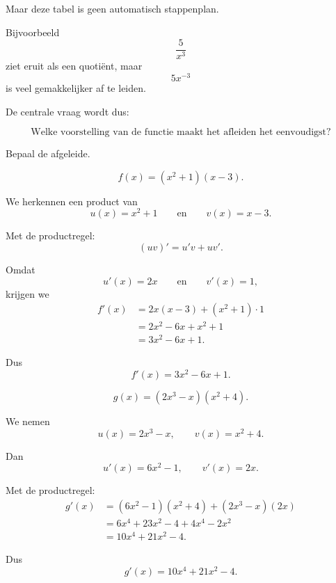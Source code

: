 \documentclass{ximera}
\begin{document}
Maar deze tabel is geen automatisch stappenplan.

Bijvoorbeeld
\[
\frac{5}{x^3}
\]
ziet eruit als een quotiënt, maar
\[
5x^{-3}
\]
is veel gemakkelijker af te leiden.

De centrale vraag wordt dus:

\[
\boxed{
\text{Welke voorstelling van de functie maakt het afleiden het eenvoudigst?}
}
\]




\begin{oefening}{\oefB\ESS}

  Bepaal de afgeleide.
  
  \begin{question}
  
  \[
  f(x)=(x^2+1)(x-3).
  \]
  
  \begin{oplossing}
  We herkennen een product van
  \[
  u(x)=x^2+1
  \qquad\text{en}\qquad
  v(x)=x-3.
  \]
  
  Met de productregel:
  \[
  (uv)'=u'v+uv'.
  \]
  
  Omdat
  \[
  u'(x)=2x
  \qquad\text{en}\qquad
  v'(x)=1,
  \]
  krijgen we
  \[
  \begin{aligned}
  f'(x)
  &=2x(x-3)+(x^2+1)\cdot1\\
  &=2x^2-6x+x^2+1\\
  &=3x^2-6x+1.
  \end{aligned}
  \]
  
  Dus
  \[
  \boxed{f'(x)=3x^2-6x+1}.
  \]
  \end{oplossing}
  
  \end{question}
  
  
  \begin{question}
  
  \[
  g(x)=(2x^3-x)(x^2+4).
  \]
  
  \begin{oplossing}
  We nemen
  \[
  u(x)=2x^3-x,
  \qquad
  v(x)=x^2+4.
  \]
  
  Dan
  \[
  u'(x)=6x^2-1,
  \qquad
  v'(x)=2x.
  \]
  
  Met de productregel:
  \[
  \begin{aligned}
  g'(x)
  &=(6x^2-1)(x^2+4)+(2x^3-x)(2x)\\
  &=6x^4+23x^2-4+4x^4-2x^2\\
  &=10x^4+21x^2-4.
  \end{aligned}
  \]
  
  Dus
  \[
  \boxed{g'(x)=10x^4+21x^2-4}.
  \]
  \end{oplossing}
  

\end{question}
\end{oefening}
\end{document}
